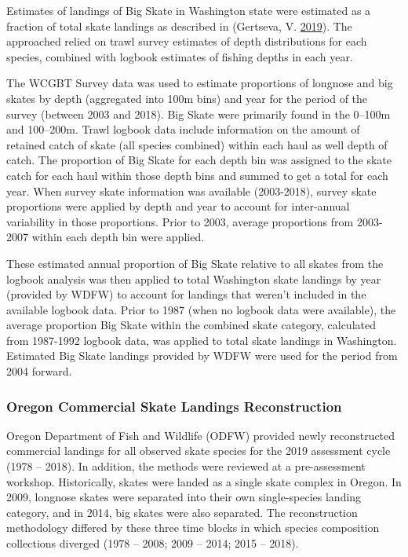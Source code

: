 \documentclass[12pt,]{article}
\begin{document}
Estimates of landings of Big Skate in Washington state were estimated as
a fraction of total skate landings as described in (Gertseva, V.
\protect\hyperlink{ref-Gertseva2019}{2019}). The approached relied on
trawl survey estimates of depth distributions for each species, combined
with logbook estimates of fishing depths in each year.

The WCGBT Survey data was used to estimate proportions of longnose and
big skates by depth (aggregated into 100m bins) and year for the period
of the survey (between 2003 and 2018). Big Skate were primarily found in
the 0--100m and 100--200m. Trawl logbook data include information on the
amount of retained catch of skate (all species combined) within each
haul as well depth of catch. The proportion of Big Skate for each depth
bin was assigned to the skate catch for each haul within those depth
bins and summed to get a total for each year. When survey skate
information was available (2003-2018), survey skate proportions were
applied by depth and year to account for inter-annual variability in
those proportions. Prior to 2003, average proportions from 2003-2007
within each depth bin were applied.

These estimated annual proportion of Big Skate relative to all skates
from the logbook analysis was then applied to total Washington skate
landings by year (provided by WDFW) to account for landings that weren't
included in the available logbook data. Prior to 1987 (when no logbook
data were available), the average proportion Big Skate within the
combined skate category, calculated from 1987-1992 logbook data, was
applied to total skate landings in Washington. Estimated Big Skate
landings provided by WDFW were used for the period from 2004 forward.

\hypertarget{oregon-commercial-skate-landings-reconstruction}{%
\subsubsection{Oregon Commercial Skate Landings
Reconstruction}\label{oregon-commercial-skate-landings-reconstruction}}

Oregon Department of Fish and Wildlife (ODFW) provided newly
reconstructed commercial landings for all observed skate species for the
2019 assessment cycle (1978 -- 2018). In addition, the methods were
reviewed at a pre-assessment workshop. Historically, skates were landed
as a single skate complex in Oregon. In 2009, longnose skates were
separated into their own single-species landing category, and in 2014,
big skates were also separated. The reconstruction methodology differed
by these three time blocks in which species composition collections
diverged (1978 -- 2008; 2009 -- 2014; 2015 -- 2018).
\end{document}
